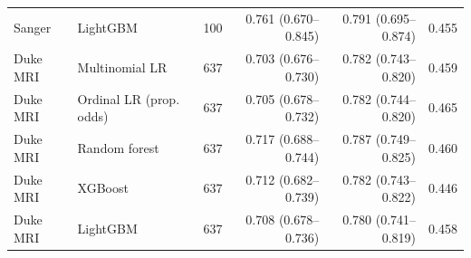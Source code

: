 \begin{tabular}{llrrrr}
Sanger & LightGBM & 100 & 0.761 (0.670--0.845) & 0.791 (0.695--0.874) & 0.455 \\
\addlinespace
Duke MRI & Multinomial LR & 637 & 0.703 (0.676--0.730) & 0.782 (0.743--0.820) & 0.459 \\
Duke MRI & Ordinal LR (prop. odds) & 637 & 0.705 (0.678--0.732) & 0.782 (0.744--0.820) & 0.465 \\
Duke MRI & Random forest & 637 & 0.717 (0.688--0.744) & 0.787 (0.749--0.825) & 0.460 \\
Duke MRI & XGBoost & 637 & 0.712 (0.682--0.739) & 0.782 (0.743--0.822) & 0.446 \\
Duke MRI & LightGBM & 637 & 0.708 (0.678--0.736) & 0.780 (0.741--0.819) & 0.458 \\
\bottomrule
\end{tabular}